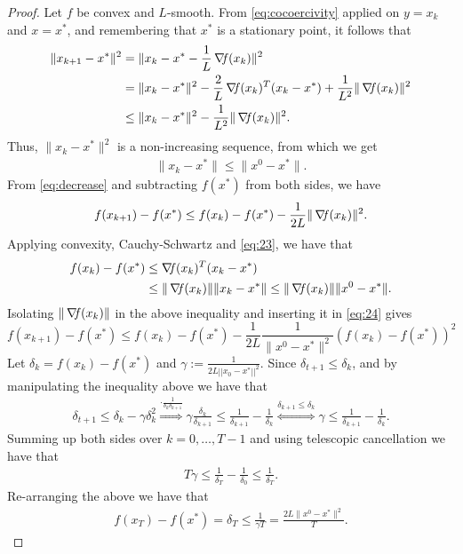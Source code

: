 \documentclass[10pt,a4paper]{article}
\begin{document}
\begin{proof}
	Let $f$ be convex and $L$-smooth. From \eqref{eq:cocoercivity} applied on $y=x_k$ and $x=x^*$, and remembering that $x^*$ is a stationary point, it follows that
	\begin{align*}
		\|x_{k+1} - x^*\|^2 &= \|x_k - x^* - \frac{1}{L}\operatorname*{\mathit{\nabla \!f}}(x_k)\|^2\\
		&= \|x_k - x^*\|^2 - \frac{2}{L} \operatorname*{\mathit{\nabla \!f}}(x_k)^T(x_k - x^*) + \frac{1}{L^2}\|\operatorname*{\mathit{\nabla \!f}}(x_k)\|^2\\
		&\leq \|x_k - x^*\|^2 - \frac{1}{L^2}\|\operatorname*{\mathit{\nabla \!f}}(x_k)\|^2.
	\end{align*}
	Thus, $\|x_k - x^*\|^2$ is a non-increasing sequence, from which we get 
	\begin{align}\label{eq:23}
		\|x_k - x^*\| \leq \|x^0 - x^*\|.
	\end{align}
	From \eqref{eq:decrease} and subtracting $f(x^*)$ from both sides, we have
	\begin{align}\label{eq:24}
		f(x_{k+1}) - f(x^*) \leq f(x_k) - f(x^*) - \frac{1}{2L}\|\operatorname*{\mathit{\nabla \!f}}(x_k)\|^2.
	\end{align}
	Applying convexity, Cauchy-Schwartz and \eqref{eq:23}, we have that
	\begin{equation*}
		\begin{split}
			f(x_k) - f(x^*) &\leq \operatorname*{\mathit{\nabla \!f}}(x_k)^T(x_k - x^*)\\
			&\leq \|\operatorname*{\mathit{\nabla \!f}}(x_k)\|\|x_k - x^*\| \leq \|\operatorname*{\mathit{\nabla \!f}}(x_k)\|\|x^0 - x^*\|.
		\end{split}
	\end{equation*}
	Isolating $\|\operatorname*{\mathit{\nabla \!f}}(x_k)\|$ in the above inequality and inserting it in \eqref{eq:24} gives
	\begin{equation*}
		f(x_{k+1}) - f(x^*) \leq f(x_k) - f(x^*) - \frac{1}{2L}\frac{1}{\|x^0 - x^*\|^2}(f(x_k) - f(x^*))^2
	\end{equation*}
	Let $\delta_k = f(x_k) - f(x^*)$ and $\gamma:=\frac{1}{2L||x_0-x^*||^2}$. Since $\delta_{t+1} \leq \delta_k$, and by manipulating the inequality above we have that
	\begin{align*}
		\delta_{t+1} \leq \delta_k - \gamma\delta_k^2 \overset{\cdot\frac{1}{\delta_k\delta_{k+1}}}{\Rightarrow} \gamma\frac{\delta_k}{\delta_{k+1}} \leq \frac{1}{\delta_{k+1}} - \frac{1}{\delta_k} \overset{\delta_{k+1}\leq\delta_k}{\Leftrightarrow} \gamma \leq \frac{1}{\delta_{k+1}} - \frac{1}{\delta_k}.
	\end{align*}
	Summing up both sides over $k = 0, \ldots, T - 1$ and using telescopic cancellation we have that
	\begin{align*}
		T\gamma \leq \frac{1}{\delta_T} - \frac{1}{\delta_0} \leq \frac{1}{\delta_T}.
	\end{align*}
Re-arranging the above we have that
	\begin{align*}
		f(x_T) - f(x^*) = \delta_T \leq \frac{1}{\gamma T} = \frac{2L\|x^0 - x^*\|^2}{T}.
	\end{align*}
\end{proof}
\end{document}
